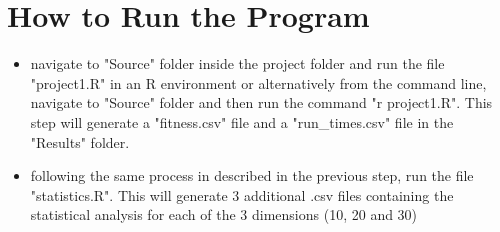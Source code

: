 \documentclass[12pt]{article}
\begin{document}
	\section{How to Run the Program}
		\begin{itemize}
			\item navigate to "Source" folder inside the project folder and run the file "project1.R" in an R environment or alternatively from the command line, navigate to "Source" folder and then run the command "r project1.R". This step will generate a "fitness.csv" file and a "run\_times.csv" file in the "Results" folder.
			\item following the same process in described in the previous step, run the file "statistics.R". This will generate 3 additional .csv files containing the statistical analysis for each of the 3 dimensions (10, 20 and 30)
		\end{itemize}
	
	
	
	
	
\end{document}
